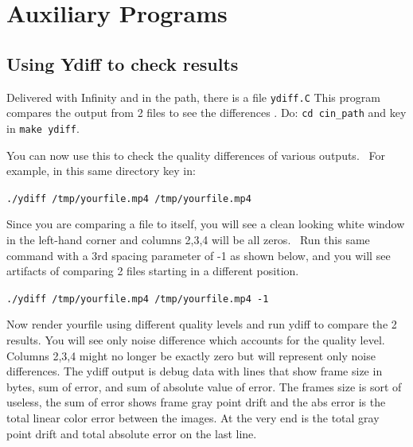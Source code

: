 \chapter{Auxiliary Programs}%
\label{cha:auxiliary_programs}

\section{Using Ydiff to check results}
\label{sec:ydiff_check_results}

Delivered with Infinity \CGG{} and in the \CGG{} path, there is a file \texttt{ydiff.C} This program compares the output from 2 files to see the differences . Do: \texttt{cd cin\_path} and key in \texttt{make ydiff}. 

You can now use this to check the quality differences of various outputs. \ For example, in this same directory key in:

\hspace{2em}\texttt{./ydiff /tmp/yourfile.mp4 /tmp/yourfile.mp4} 

Since you are comparing a file to itself, you will see a clean looking white window in the left-hand corner and columns 2,3,4 will be all zeros. \ Run this same command with a 3rd spacing parameter of {}-1 as shown below, and you will see artifacts of comparing 2 files starting in a different position.

\hspace{2em}\texttt{./ydiff /tmp/yourfile.mp4 /tmp/yourfile.mp4 -1}

Now render yourfile using different quality levels and run ydiff to compare the 2 results. You will see only noise difference which accounts for the quality level. Columns 2,3,4 might no longer be exactly zero but will represent only noise differences. The ydiff output is debug data with lines that show frame size in bytes, sum of error, and sum of absolute value of error. The frames size is sort of useless, the sum of error shows frame gray point drift and the abs error is the total linear color error between the images. At the very end is the total gray point drift and total absolute error on the last line.

